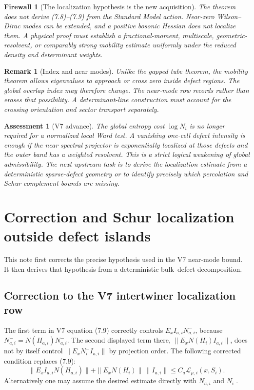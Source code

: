 \documentclass[11pt]{article}
\newtheorem{remark}[theorem]{Remark}
\newtheorem{assessment}[theorem]{Assessment}
\newtheorem{firewall}[theorem]{Firewall}
\begin{document}
\begin{firewall}[The localization hypothesis is the new acquisition]
\label{fw:v11v7-localization}
The theorem does not derive (7.8)--(7.9) from the Standard Model action.
Near-zero Wilson--Dirac modes can be extended, and a positive bosonic
Hessian does not localize them.  A physical proof must establish a
fractional-moment, multiscale, geometric-resolvent, or comparably strong
mobility estimate uniformly under the reduced density and determinant
weights.
\end{firewall}

\begin{remark}[Index and near modes]
\label{rem:v11v7-index}
Unlike the gapped tube theorem, the mobility theorem allows eigenvalues to
approach or cross zero inside defect regions.  The global overlap index may
therefore change.  The near-mode row records rather than erases that
possibility.  A determinant-line construction must account for the
crossing orientation and sector transport separately.
\end{remark}

\begin{assessment}[V7 advance]
\label{ass:v11v7}
The global entropy cost \(\log N_i\) is no longer required for a normalized
local Ward test.  A vanishing one-cell defect intensity is enough if the
near spectral projector is exponentially localized at those defects and
the outer band has a weighted resolvent.  This is a strict logical
weakening of global admissibility.  The next upstream task is to derive
the localization estimate from a deterministic sparse-defect geometry or
to identify precisely which percolation and Schur-complement bounds are
missing.
\end{assessment}


\section{Correction and Schur localization outside defect islands}
\label{sec:v11v8}

This note first corrects the precise hypothesis used in the V7 near-mode
bound.  It then derives that hypothesis from a deterministic
bulk--defect decomposition.

\subsection{Correction to the V7 intertwiner localization row}

The first term in V7 equation (7.9) correctly controls
\(E_xI_{a,i}N_{a,i}^-\), because
\(N_{a,i}^-=N(H_{a,i})N_{a,i}^-\).  The second displayed term there,
\(\|E_xN(H_i)I_{a,i}\|\), does not by itself control
\(\|E_xN_i^-I_{a,i}\|\) by projection order.  The following corrected
condition replaces (7.9):
\[
 \boxed{
 \|E_xI_{a,i}N(H_{a,i})\|
 +
 \|E_xN(H_i)\|\,\|I_{a,i}\|
 \leq
 C_a\mathcal L_{\mu,i}(x,S_i).
 }
 \tag{8.1}
\]
Alternatively one may assume the desired estimate directly with
\(N_{a,i}^-\) and \(N_i^-\).
\end{document}
